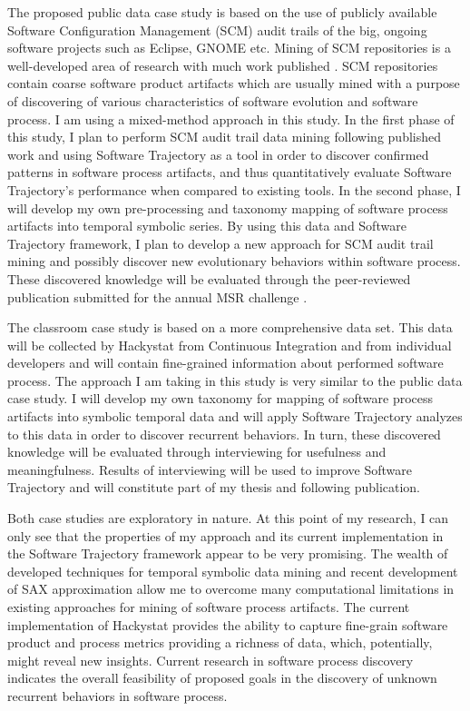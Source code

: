 \documentclass{sig-alternate}
\begin{document}
The proposed public data case study is based on the use of publicly available Software Configuration Management (SCM) audit trails of the big, ongoing software projects such as Eclipse, GNOME etc. Mining of SCM repositories is a well-developed area of research with much work published \cite{citeulike:5043676}. SCM repositories contain coarse software product artifacts which are usually mined with a purpose of discovering of various characteristics of software evolution and software process. I am using a mixed-method approach in this study. In the first phase of this study, I plan to perform SCM audit trail data mining following published work and using Software Trajectory as a tool in order to discover confirmed patterns in software process artifacts, and thus quantitatively evaluate Software Trajectory's performance when compared to existing tools. In the second phase, I will develop my own pre-processing and taxonomy mapping of software process artifacts into temporal symbolic series. By using this data and Software Trajectory framework, I plan to develop a new approach for SCM audit trail mining and possibly discover new evolutionary behaviors within software process. These discovered knowledge will be evaluated through the peer-reviewed publication submitted for the annual MSR challenge \cite{citeulike:5043676}.

The classroom case study is based on a more comprehensive data set. This data will be collected by Hackystat from Continuous Integration and from individual developers and will contain fine-grained information about performed software process. The approach I am taking in this study is very similar to the public data case study. I will develop my own taxonomy for mapping of software process artifacts into symbolic temporal data and will apply Software Trajectory analyzes to this data in order to discover recurrent behaviors. In turn, these discovered knowledge will be evaluated through interviewing for usefulness and meaningfulness. Results of interviewing will be used to improve Software Trajectory and will constitute part of my thesis and following publication.

Both case studies are exploratory in nature. At this point of my research, I can only see that the properties of my approach and its current implementation in the Software Trajectory framework appear to be very promising. The wealth of developed techniques for temporal symbolic data mining and recent development of SAX approximation allow me to overcome many computational limitations in existing approaches for mining of software process artifacts. The current implementation of Hackystat provides the ability to capture fine-grain software product and process metrics providing a richness of data, which, potentially, might reveal new insights. Current research in software process discovery indicates the overall feasibility of proposed goals in the discovery of unknown recurrent behaviors in software process. 
\end{document}
